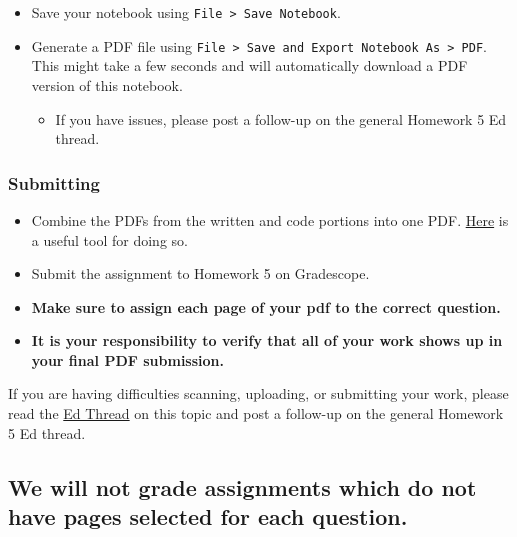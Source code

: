 \documentclass[11pt]{article}
\providecommand{\tightlist}{%
      \setlength{\itemsep}{0pt}\setlength{\parskip}{0pt}}
\begin{document}
\begin{itemize}
\tightlist
\item
  Save your notebook using
  \texttt{File\ \textgreater{}\ Save\ Notebook}.
\item
  Generate a PDF file using
  \texttt{File\ \textgreater{}\ Save\ and\ Export\ Notebook\ As\ \textgreater{}\ PDF}.
  This might take a few seconds and will automatically download a PDF
  version of this notebook.

  \begin{itemize}
  \tightlist
  \item
    If you have issues, please post a follow-up on the general Homework
    5 Ed thread.
  \end{itemize}
\end{itemize}

\subsubsection{Submitting}\label{submitting}

\begin{itemize}
\tightlist
\item
  Combine the PDFs from the written and code portions into one PDF.
  \href{https://smallpdf.com/merge-pdf}{Here} is a useful tool for doing
  so.
\item
  Submit the assignment to Homework 5 on Gradescope.
\item
  \textbf{Make sure to assign each page of your pdf to the correct
  question.}
\item
  \textbf{It is your responsibility to verify that all of your work
  shows up in your final PDF submission.}
\end{itemize}

If you are having difficulties scanning, uploading, or submitting your
work, please read the
\href{https://edstem.org/us/courses/94054/discussion/7533569}{Ed Thread}
on this topic and post a follow-up on the general Homework 5 Ed thread.

\subsection{\texorpdfstring{\textbf{We will not grade assignments which
do not have pages selected for each
question.}}{We will not grade assignments which do not have pages selected for each question.}}\label{we-will-not-grade-assignments-which-do-not-have-pages-selected-for-each-question.}


    
    
    
\end{document}
